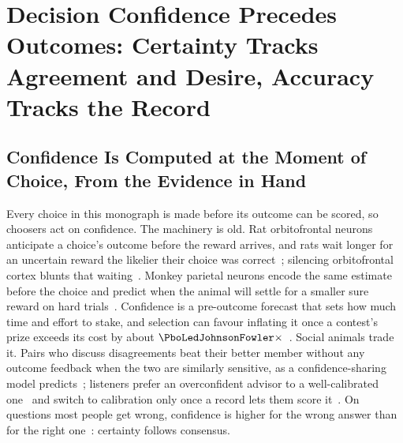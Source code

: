\section{Decision Confidence Precedes Outcomes: Certainty Tracks Agreement and Desire, Accuracy Tracks the Record}\label{sec:decisionconf}

\subsection{Confidence Is Computed at the Moment of Choice, From the Evidence in Hand}
Every choice in this monograph is made before its outcome can be scored, so choosers act on confidence. The machinery is old. Rat orbitofrontal neurons anticipate a choice's outcome before the reward arrives, and rats wait longer for an uncertain reward the likelier their choice was correct~\cite{kepecs2008}; silencing orbitofrontal cortex blunts that waiting~\cite{lak2014}. Monkey parietal neurons encode the same estimate before the choice and predict when the animal will settle for a smaller sure reward on hard trials~\cite{kiani2009}. Confidence is a pre-outcome forecast that sets how much time and effort to stake, and selection can favour inflating it once a contest's prize exceeds its cost by about $\PboLedJohnsonFowler\times$~\cite{johnson2011}. Social animals trade it. Pairs who discuss disagreements beat their better member without any outcome feedback when the two are similarly sensitive, as a confidence-sharing model predicts~\cite{bahrami2010}; listeners prefer an overconfident advisor to a well-calibrated one~\cite{price2004} and switch to calibration only once a record lets them score it~\cite{tenney2007}. On questions most people get wrong, confidence is higher for the wrong answer than for the right one~\cite{koriat2008}: certainty follows consensus.

